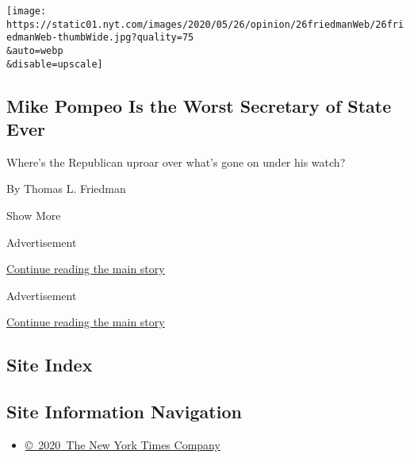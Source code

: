 \begin{enumerate}
  \texttt{[image: https://static01.nyt.com/images/2020/05/26/opinion/26friedmanWeb/26friedmanWeb-thumbWide.jpg?quality=75\\\&auto=webp\\\&disable=upscale]}

  \hypertarget{mike-pompeo-is-the-worst-secretary-of-state-ever}{%
  \subsection{Mike Pompeo Is the Worst Secretary of State
  Ever}\label{mike-pompeo-is-the-worst-secretary-of-state-ever}}

  Where's the Republican uproar over what's gone on under his watch?

  By Thomas L. Friedman
\end{enumerate}

Show More

Advertisement

\protect\hyperlink{after-mid1}{Continue reading the main story}

Advertisement

\protect\hyperlink{after-mktg}{Continue reading the main story}

\hypertarget{site-index}{%
\subsection{Site Index}\label{site-index}}

\hypertarget{site-information-navigation}{%
\subsection{Site Information
Navigation}\label{site-information-navigation}}

\begin{itemize}
\tightlist
\item
  \href{https://help.nytimes.com/hc/en-us/articles/115014792127-Copyright-notice}{©~2020~The
  New York Times Company}
\end{itemize}

